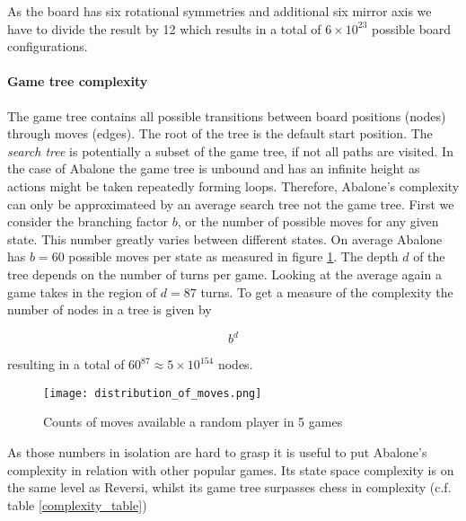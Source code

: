 As the board has six rotational symmetries and additional six mirror axis we have to divide the result by 12 which results in a total of $ 6 \times 10^{23} $ possible board configurations. \cite[p. 4]{lemmens_constructing_2005}

\paragraph{Game tree complexity} The game tree contains all possible transitions between board positions (nodes) through moves (edges). The root of the tree is the default start position. The \textit{search tree} is potentially a subset of the game tree, if not all paths are visited. In the case of Abalone the game tree is unbound and has an infinite height as actions might be taken repeatedly forming loops. Therefore, Abalone's complexity can only be approximateed by an average search tree not the game tree. First we consider the branching factor $ b $, or the number of possible moves for any given state. This number greatly varies between different states. On average Abalone has $ b = 60 $ possible moves per state as measured in figure \ref{branching_factor}. The depth $ d $ of the tree depends on the number of turns per game. Looking at the average again a game takes in the region of $ d = 87 $ turns. To get a measure of the complexity the number of nodes in a tree is given by

\begin{equation}
    b^d
\end{equation}

resulting in a total of $60^{87} \approx 5 \times 10^{154}$ nodes. \cite{lemmens_constructing_2005}

\begin{figure}
    \centering
    \texttt{[image: distribution\_of\_moves.png]}
    \caption{Counts of moves available a random player in 5 games}
    \label{branching_factor}
\end{figure}

As those numbers in isolation are hard to grasp it is useful to put Abalone's complexity in relation with other popular games. Its state space complexity is on the same level as Reversi, whilst its game tree surpasses chess in complexity (c.f. table \ref{complexity_table})

